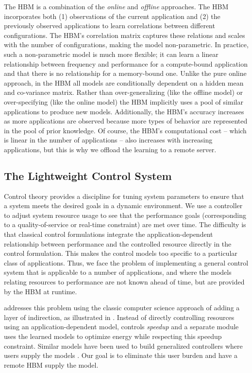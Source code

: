 The HBM is a combination of the \emph{online} and \emph{offline}
approaches. The HBM incorporates both (1) observations of the current
application and (2) the previously observed applications to learn
correlations between different configurations.  The HBM's correlation
matrix captures these relations and scales with the number of
configurations, making the model non-parametric.  In practice, such a
non-parametric model is much more flexible; \eg{} it can learn a
linear relationship between frequency and performance for a
compute-bound application and that there is no relationship for a
memory-bound one.  Unlike the pure online approach, in the HBM all
models are conditionally dependent on a hidden mean and co-variance
matrix.  Rather than over-generalizing (like the offline model) or
over-specifying (like the online model) the HBM implicitly uses a pool
of similar applications to produce new models. Additionally, the HBM's
accuracy increases as more applications are observed because more
types of behavior are represented in the pool of prior knowledge.  Of
course, the HBM's computational cost -- which is linear in the number
of applications -- also increases with increasing applications, but
this is why we offload the learning to a remote server.

\subsection{The Lightweight Control System}

Control theory provides a discipline for tuning system parameters to
ensure that a system meets the desired goals in a dynamic environment.
We use a controller to adjust system resource usage to see that the
performance goals (corresponding to a quality-of-service or real-time
constraint) are met over time.  The difficulty is that classical
control formulations integrate the application-dependent relationship
between performance and the controlled resource directly in the
control formulation. This makes the control models too specific to a
particular class of applications.  Thus, we face the problem of
implementing a general control system that is applicable to a number
of applications, and where the models relating resources to
performance are not known ahead of time, but are provided by the HBM
at runtime.

\SYSTEM{} addresses this problem using the classic computer science
approach of adding a layer of indirection, as illustrated in
.  Instead of directly controlling resources
using an application-dependent model, \SYSTEM{} controls
\emph{speedup} and a separate module uses the learned models to
optimize energy while respecting this speedup constraint.  Similar
models have been used to build generalized controllers where users supply the models \cite{ControlWare,POET}.  Our
goal is to eliminate this user burden and have a remote HBM supply the
model.

